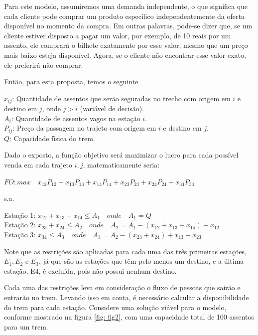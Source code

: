 Para este modelo, assumiremos uma demanda independente, o que significa que cada cliente pode comprar um produto específico independentemente da oferta disponível no momento da compra. Em outras palavras, pode-se dizer que, se um cliente estiver disposto a pagar um valor, por exemplo, de 10 reais por um assento, ele comprará o bilhete exatamente por esse valor, mesmo que um preço mais baixo esteja disponível. Agora, se o cliente não encontrar esse valor exato, ele preferirá não comprar.

Então, para esta proposta, temos o seguinte

\noindent $x_{ij}$: Quantidade de assentos que serão seguradas no trecho com origem em $i$ e destino em $j$, onde $j>i$ (variável de decisão). \\
\noindent $A_i$: Quantidade de assentos vagos na estação $i$. \\
\noindent $P_{ij}$: Preço da passagem no trajeto com origem em $i$ e destino em $j$. \\
\noindent $Q$: Capacidade física do trem.

Dado o exposto, a função objetivo será maximizar o lucro para cada possível venda em cada trajeto $i,j$, matematicamente seria:

$FO: max \quad x_{12}P_{12} + x_{13}P_{13} + x_{14}P_{14} + x_{23}P_{23} + x_{24}P_{24} + x_{34}P_{34}$

s.a.

Estação 1: $x_{12} + x_{13} + x_{14} \leq A_1 \quad onde \quad A_1 = Q $ \\
\indent Estação 2: $x_{23} + x_{24}  \leq  A_2 \quad onde \quad A_2 = A_1 - (x_{12} + x_{13} + x_{14}) + x_{12} $ \\
\indent Estação 3: $x_{34} \leq A_3 \quad onde \quad A_3 = A_2 - (x_{23} + x_{24}) + x_{13} + x_{23} $

Note que as restrições são aplicadas para cada uma das três primeiras estações, $E_1, E_2$ e $E_3$, já que são as estações que têm pelo menos um destino, e a última estação, E4, é excluída, pois não possui nenhum destino.

Cada uma das restrições leva em consideração o fluxo de pessoas que sairão e entrarão no trem. Levando isso em conta, é necessário calcular a disponibilidade do trem para cada estação. Considere uma solução viável para o modelo, conforme mostrado na figura \ref{fig: fig2}, com uma capacidade total de 100 assentos para um trem.

